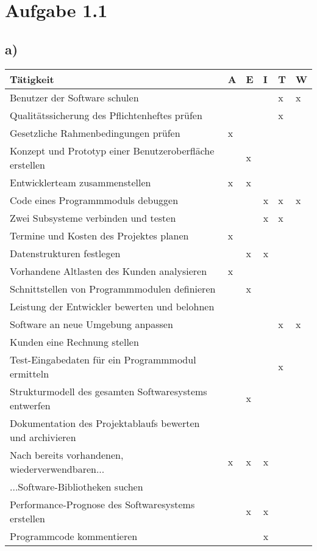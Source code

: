 \documentclass[a4paper,11pt]{scrartcl}
\begin{document}
		
	\section*{Aufgabe 1.1}
	\subsection*{a)}
	\begin{table}[h!]
		\begin{tabular}{l|l|l|l|l|l}
		 \textbf{Tätigkeit} 										&A &E &I &T &W \\ 
		 \hline
		 Benutzer der Software schulen								&  &  &  &x &x \\
		 Qualitätssicherung des Pflichtenheftes prüfen				&  &  &  &x &  \\
		 Gesetzliche Rahmenbedingungen prüfen						&x &  &  &  &  \\
		 Konzept und Prototyp einer Benutzeroberfläche erstellen	&  &x &  &  &  \\
		 Entwicklerteam zusammenstellen								&x &x &  &  &  \\
		 Code eines Programmmoduls debuggen							&  &  &x &x &x \\
 		 Zwei Subsysteme verbinden und testen						&  &  &x &x &  \\
 		 Termine und Kosten des Projektes planen					&x &  &  &  &  \\
		 Datenstrukturen festlegen									&  &x &x &  &  \\
		 Vorhandene Altlasten des Kunden analysieren				&x &  &  &  &  \\
		 Schnittstellen von Programmmodulen definieren				&  &x &  &  &  \\
		 Leistung der Entwickler bewerten und belohnen				&  &  &  &  &  \\
		 Software an neue Umgebung anpassen							&  &  &  &x &x \\
		 Kunden eine Rechnung stellen								&  &  &  &  &  \\
		 Test-Eingabedaten für ein Programmmodul ermitteln			&  &  &  &x &  \\ 
		 Strukturmodell des gesamten Softwaresystems entwerfen		&  &x &  &  &  \\ 
		 Dokumentation des Projektablaufs bewerten und archivieren	&  &  &  &  &  \\ 
		 Nach bereits vorhandenen, wiederverwendbaren... 			&x &x &x &  &  \\ 
		 \hspace*{10mm} ...Software-Bibliotheken suchen	            &  &  &  &  &  \\ 	
		 Performance-Prognose des Softwaresystems erstellen			&  &x &x &  &  \\ 
		 Programmcode kommentieren									&  &  &x &  &  \\ 
		\end{tabular}
	\end{table}
\end{document}
